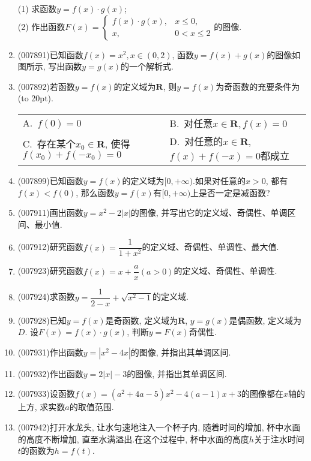 \documentclass[10pt,a4paper]{article}
\newcommand{\bracket}[1]{(\hbox to #1pt{})}
\newcommand{\twoch}[4]{\par\begin{tabular}{p{.46\textwidth}p{.46\textwidth}}
A.~#1& B.~#2\\
C.~#3& D.~#4
\end{tabular}}
\begin{document}
\begin{enumerate}[1.]
(1) 求函数$y=f(x)\cdot g(x)$;\\
(2) 作出函数$F(x)=\begin{cases} f(x)\cdot g(x), & x\le 0, \\ x, & 0<x\le 2 \end{cases}$的图像.
\item {\tiny (007891)}已知函数$f(x)=x^2,x\in (0,2)$, 函数$y=f(x)+g(x)$的图像如图所示, 写出函数$y=g(x)$的一个解析式.
\begin{center}
\end{center}
\item {\tiny (007892)}若函数$y=f(x)$的定义域为$\mathbf{R}$, 则$y=f(x)$为奇函数的充要条件为\bracket{20}.
\twoch{$f(0)=0$}{对任意$x\in \mathbf{R},f(x)=0$}{存在某个$x_0\in \mathbf{R}$, 使得$f(x_0)+f(-x_0)=0$}{对任意的$x\in \mathbf{R}$, $f(x)+f(-x)=0$都成立}
\item {\tiny (007899)}已知函数$y=f(x)$的定义域为$[0,+\infty)$.如果对任意的$x>0$, 都有$f(x)<f(0)$, 那么函数$y=f(x)$有$[0,+\infty)$上是否一定是减函数?
\item {\tiny (007911)}画出函数$y=x^2-2|x|$的图像, 并写出它的定义域、奇偶性、单调区间、最小值.
\item {\tiny (007912)}研究函数$f(x)=\dfrac 1{1+x^2}$的定义域、奇偶性、单调性、最大值.
\item {\tiny (007923)}研究函数$f(x)=x+\dfrac ax(a>0)$的定义域、奇偶性、单调性.
\item {\tiny (007924)}求函数$y=\dfrac 1{2-x}+\sqrt {x^2-1}$的定义域.
\item {\tiny (007928)}已知$y=f(x)$是奇函数, 定义域为$\mathbf{R}$, $y=g(x)$是偶函数, 定义域为$D$. 设$F(x)=f(x)\cdot g(x)$, 判断$y=F(x)$奇偶性.
\item {\tiny (007931)}作出函数$y=|x^2-4x|$的图像, 并指出其单调区间.
\item {\tiny (007932)}作出函数$y=2|x|-3$的图像, 并指出其单调区间.
\item {\tiny (007933)}设函数$f(x)=(a^2+4a-5)x^2-4(a-1)x+3$的图像都在$x$轴的上方, 求实数$a$的取值范围.
\item {\tiny (007942)}打开水龙头, 让水匀速地注入一个杯子内, 随着时间的增加, 杯中水面的高度不断增加, 直至水满溢出.在这个过程中, 杯中水面的高度$h$关于注水时间$t$的函数为$h=f(t)$.

\end{enumerate}
\end{document}

